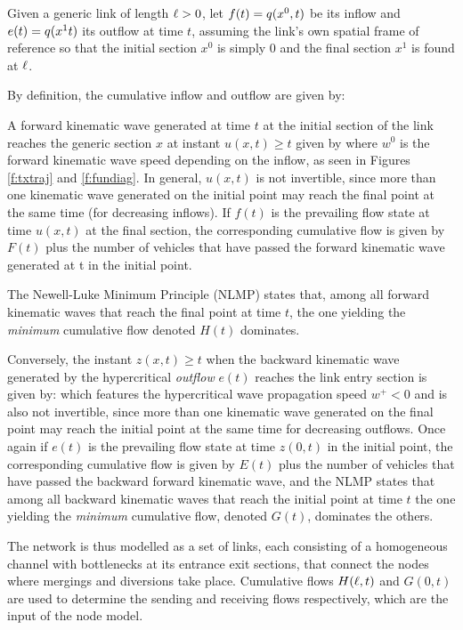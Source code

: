 Given a generic link of length $\ell > 0$, let $f(t) = q(x^0,t)$ be its inflow and $e(t) = q(x^1t)$ its outflow at time $t$, assuming the link's own spatial frame of reference so that the initial section $x^0$ is simply 0 and the final section $x^1$ is found at $\ell$.

By definition, the cumulative inflow and outflow are given by:

A forward kinematic wave generated at time $t$ at the initial section of the link reaches the generic section $x$ at instant $u(x,t) \geqslant t$ given by
where $w^0$ is the forward kinematic wave speed depending on the inflow, as seen in Figures \ref{f:txtraj} and \ref{f:fundiag}. In general, $u(x,t)$ is not invertible, since more than one kinematic wave generated on the initial point may reach the final point at the same time (for decreasing inflows). If $f(t)$ is the prevailing flow state at time $u(x,t)$ at the final section, the corresponding cumulative flow is given by $F(t)$ plus the number of vehicles that have passed the forward kinematic wave generated at t in the initial point.

The Newell-Luke Minimum Principle (NLMP) states that, among all forward kinematic waves that reach the final point at time $t$, the one yielding the \emph{minimum} cumulative flow denoted $H(t)$ dominates.

Conversely, the instant $z(x,t) \geqslant t$ when the backward kinematic wave generated by the hypercritical \emph{outflow} $e(t)$ reaches the link entry section is given by:
which features the hypercritical wave propagation speed $w^+ < 0$ and is also not invertible, since more than one kinematic wave generated on the final point may reach the initial point at the same time for decreasing outflows. Once again if $e(t)$ is the prevailing flow state at time $z(0,t)$ in the initial point, the corresponding cumulative flow is given by $E(t)$ plus the number of vehicles that have passed the backward forward kinematic wave, and the NLMP states that among all backward kinematic waves that reach the initial point at time $t$ the one yielding the \emph{minimum} cumulative flow, denoted $G(t)$, dominates the others.

The network is thus modelled as a set of links, each consisting of a homogeneous channel with bottlenecks at its entrance exit sections, that connect the nodes where mergings and diversions take place. Cumulative flows $H(\ell,t)$ and $G(0,t)$ are used to determine the sending and receiving flows respectively, which are the input of the node model.


